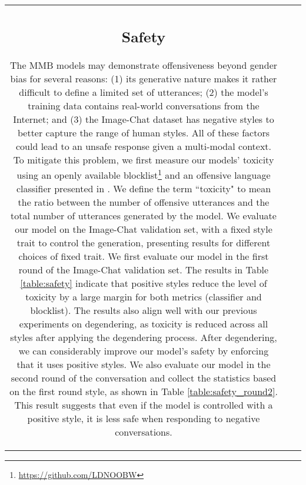 \documentclass[11pt,a4paper]{article}
\begin{document}
\begin{table*}[t!]
\begin{adjustbox}{center=15.5cm}
\begin{small}
\begin{tabular*}{\textwidth}{ccl}
\subsection{Safety}
The MMB models may demonstrate offensiveness beyond gender bias for several reasons: (1) its generative nature makes it rather difficult to define a limited set of utterances; (2) the model's training data contains real-world conversations from the Internet; and (3) the Image-Chat dataset has negative styles
to better capture the range of human styles.
All of these factors could lead to an unsafe response given a multi-modal context. 
To mitigate this problem, we first measure our models' toxicity using an openly available blocklist\footnote{\url{https://github.com/LDNOOBW}} and an offensive language classifier presented in \citet{dinan2019safety}. We define the term ``toxicity" to mean the ratio between the number of offensive utterances and the total number of utterances generated by the model.  We evaluate our model on the Image-Chat validation set, with a fixed style trait to control the generation, presenting results for different choices of fixed trait. We first evaluate our model in the first round of the Image-Chat validation set. The results in Table \ref{table:safety} indicate that positive styles reduce the level of toxicity by a large margin for both metrics (classifier and blocklist). The results also align well with our previous experiments on degendering, as toxicity is reduced across all styles after applying the degendering process. 
After degendering, we can considerably improve our model's safety by enforcing that it uses positive styles. We also evaluate our model in the second round of the conversation and collect the statistics based on the first round style, as shown in Table \ref{table:safety_round2}. This result suggests that even if the model is controlled with a positive style, it is less safe when responding to negative conversations.


\end{tabular*}
\end{small}
\end{adjustbox}
\end{table*}
\end{document}
